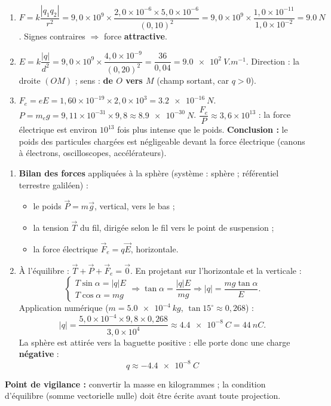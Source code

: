 \documentclass[11pt]{article}
\begin{document}
\begin{corrige}
\begin{enumerate}
\item $F = k\dfrac{|q_1 q_2|}{r^2} = 9,0\times 10^{9}\times\dfrac{2,0\times 10^{-6}\times 5,0\times 10^{-6}}{(0,10)^2} = 9,0\times 10^{9}\times\dfrac{1,0\times 10^{-11}}{1,0\times 10^{-2}} = \SI{9,0}{N}$.
Signes contraires $\Rightarrow$ force \textbf{attractive}.
\item $E = k\dfrac{|q|}{d^2} = 9,0\times 10^{9}\times\dfrac{4,0\times 10^{-9}}{(0,20)^2} = \dfrac{36}{0,04} = \SI{9,0e2}{V.m^{-1}}$.
Direction : la droite $(OM)$ ; sens : \textbf{de $O$ vers $M$} (champ sortant, car $q>0$).
\item $F_e = eE = 1,60\times 10^{-19}\times 2,0\times 10^{3} = \SI{3,2e-16}{N}$.
$P = m_e g = 9,11\times 10^{-31}\times 9,8 \approx \SI{8,9e-30}{N}$.
$\dfrac{F_e}{P} \approx 3,6\times 10^{13}$ : la force électrique est environ $10^{13}$ fois plus intense que le poids. \textbf{Conclusion :} le poids des particules chargées est négligeable devant la force électrique (canons à électrons, oscilloscopes, accélérateurs).
\end{enumerate}
\end{corrige}

\begin{corrige}
\begin{enumerate}
\item \textbf{Bilan des forces} appliquées à la sphère (système : sphère ; référentiel terrestre galiléen) :
\begin{itemize}
\item le poids $\vec{P} = m\vec{g}$, vertical, vers le bas ;
\item la tension $\vec{T}$ du fil, dirigée selon le fil vers le point de suspension ;
\item la force électrique $\vec{F}_e = q\vec{E}$, horizontale.
\end{itemize}
\item À l'équilibre : $\vec{T} + \vec{P} + \vec{F}_e = \vec{0}$. En projetant sur l'horizontale et la verticale :
\[ \begin{cases} T\sin\alpha = |q|E \\ T\cos\alpha = mg \end{cases} \Rightarrow \tan\alpha = \frac{|q|E}{mg} \Rightarrow |q| = \frac{mg\tan\alpha}{E}. \]
Application numérique ($m = \SI{5,0e-4}{kg}$, $\tan 15^\circ \approx 0,268$) :
\[ |q| = \frac{5,0\times 10^{-4}\times 9,8\times 0,268}{3,0\times 10^{4}} \approx \SI{4,4e-8}{C} = \SI{44}{nC}. \]
La sphère est attirée vers la baguette positive : elle porte donc une charge \textbf{négative} :
\[ \boxed{q \approx -\SI{4,4e-8}{C}} \]
\end{enumerate}
\textbf{Point de vigilance :} convertir la masse en kilogrammes ; la condition d'équilibre (somme vectorielle nulle) doit être écrite avant toute projection.
\end{corrige}
\end{document}
